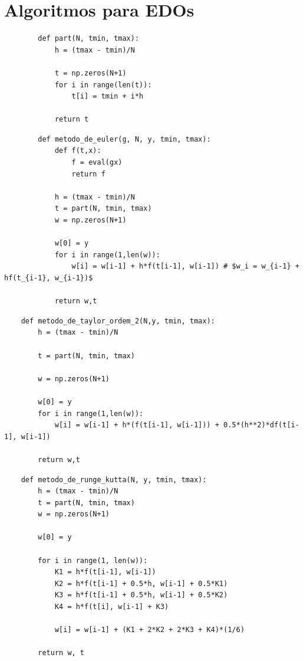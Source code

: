 \documentclass[a4paper, 11pt]{report}
\begin{document}
\section{Algoritmos para EDOs}
\begin{verbatim}
        def part(N, tmin, tmax):
            h = (tmax - tmin)/N
            
            t = np.zeros(N+1)
            for i in range(len(t)):
                t[i] = tmin + i*h
            
            return t
\end{verbatim}
\begin{verbatim}
        def metodo_de_euler(g, N, y, tmin, tmax):
            def f(t,x):
                f = eval(gx)
                return f
    
            h = (tmax - tmin)/N
            t = part(N, tmin, tmax)
            w = np.zeros(N+1)
            
            w[0] = y
            for i in range(1,len(w)):
                w[i] = w[i-1] + h*f(t[i-1], w[i-1]) # $w_i = w_{i-1} + hf(t_{i-1}, w_{i-1})$
                
            return w,t
\end{verbatim}
\begin{verbatim}
    def metodo_de_taylor_ordem_2(N,y, tmin, tmax):
        h = (tmax - tmin)/N
        
        t = part(N, tmin, tmax)
        
        w = np.zeros(N+1)
        
        w[0] = y
        for i in range(1,len(w)):
            w[i] = w[i-1] + h*(f(t[i-1], w[i-1])) + 0.5*(h**2)*df(t[i-1], w[i-1])
            
        return w,t
\end{verbatim}
\begin{verbatim}
    def metodo_de_runge_kutta(N, y, tmin, tmax):
        h = (tmax - tmin)/N
        t = part(N, tmin, tmax)
        w = np.zeros(N+1)
        
        w[0] = y
        
        for i in range(1, len(w)):
            K1 = h*f(t[i-1], w[i-1])
            K2 = h*f(t[i-1] + 0.5*h, w[i-1] + 0.5*K1)
            K3 = h*f(t[i-1] + 0.5*h, w[i-1] + 0.5*K2)
            K4 = h*f(t[i], w[i-1] + K3)
            
            w[i] = w[i-1] + (K1 + 2*K2 + 2*K3 + K4)*(1/6)
            
        return w, t
\end{verbatim}
\end{document}
